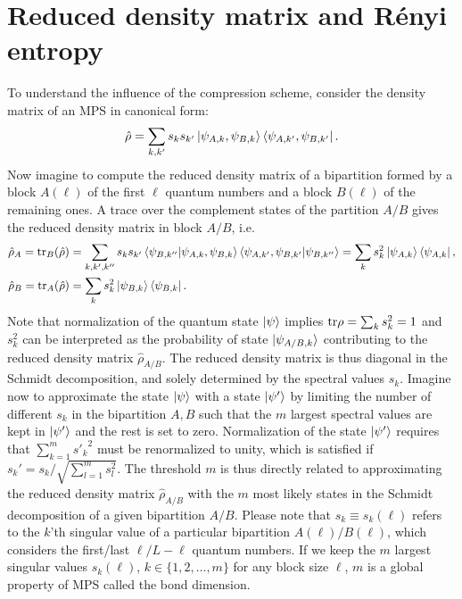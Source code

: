 \section{Reduced density matrix and Rényi entropy}
\label{sec:reduced_density_matrix_and_renyi_entropy}
%
%
To understand the influence of the compression scheme, consider the density matrix of an MPS in canonical form:
\begin{align}
    \hat\rho = \sum_{k,k'}s_ks_{k'}\ket{\psi_{A,k},\psi_{B,k}}\bra{\psi_{A,k'},\psi_{B,k'}}.
\end{align}
Now imagine to compute the reduced density matrix of a bipartition formed by a block $A(\ell)$ of the first $\ell$ quantum numbers and a block $B(\ell)$ of the remaining ones.
A trace over the complement states of the partition $A/B$ gives the reduced density matrix in block $A/B$, i.e.
\begin{align}
    \hat\rho_A = {\rm tr}_B(\hat\rho)
    &=
    \sum_{k,k',k''}
    s_ks_{k'}
    \braket{\psi_{B,k''}|\psi_{A,k},\psi_{B,k}}\braket{\psi_{A,k'},\psi_{B,k'}|\psi_{B,k''}}
    =
    \sum_k s_k^2 \ket{\psi_{A,k}}\bra{\psi_{A,k}},\nonumber\\
    \hat\rho_B = {\rm tr}_A(\hat\rho)
    &=
    \sum_k s_k^2 \ket{\psi_{B,k}}\bra{\psi_{B,k}}.
\end{align}
Note that normalization of the quantum state $\ket\psi$ implies ${\rm tr}\rho=\sum_k s_k^2=1$ and $s_k^2$ can be interpreted as the probability of state $\ket{\psi_{A/B,k}}$ contributing to the reduced density matrix $\hat\rho_{A/B}$.
The reduced density matrix is thus diagonal in the Schmidt decomposition, and solely determined by the spectral values $s_k$.
Imagine now to approximate the state $\ket\psi$ with a state $\ket{\psi'}$ by limiting the number of different $s_k$ in the bipartition $A,B$ such that the $m$ largest spectral values are kept in $\ket{\psi'}$ and the rest is set to zero.
Normalization of the state $\ket{\psi'}$ requires that $\sum_{k=1}^m {s'_k}^2$ must be renormalized to unity, which is satisfied if $s_k'=s_k/\sqrt{\sum_{l=1}^m s_l^2}$.
The threshold $m$ is thus directly related to approximating the reduced density matrix $\hat \rho_{A/B}$ with the $m$ most likely states in the Schmidt decomposition of a given bipartition $A/B$.
Please note that $s_k\equiv s_k(\ell)$ refers to the $k$'th singular value of a particular bipartition $A(\ell)/B(\ell)$, which considers the first/last $\ell/L-\ell$ quantum numbers.
If we keep the $m$ largest singular values $s_k(\ell)$, $k\in\{1,2,\dots,m\}$ for any block size $\ell$, $m$ is a global property of MPS called the bond dimension.

